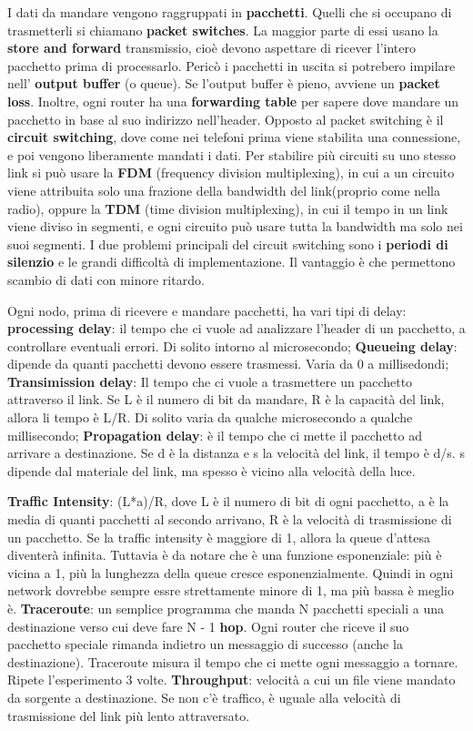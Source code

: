 \documentclass[a4paper,10pt]{article} %
\renewcommand{\b}[1]{%
    {\textbf{#1}}}
\begin{document}
\tiny

I dati da mandare vengono raggruppati in \b{pacchetti}. Quelli che si occupano di trasmetterli si chiamano \b{packet switches}. La maggior parte di essi usano la \b{store and forward} transmissio, cioè devono aspettare di ricever l'intero pacchetto prima di processarlo. Pericò i pacchetti in uscita si potrebero impilare nell'\b{output buffer} (o queue). Se l'output buffer è pieno, avviene un \b{packet loss}. Inoltre, ogni router ha una \b{forwarding table} per sapere dove mandare un pacchetto in base al suo indirizzo nell'header. 
Opposto al packet switching è il \b{circuit switching}, dove come nei telefoni prima viene stabilita una connessione, e poi vengono liberamente mandati i dati. Per stabilire più circuiti su uno stesso link si può usare la \b{FDM} (frequency division multiplexing), in cui a un circuito viene attribuita solo una frazione della bandwidth del link(proprio come nella radio), oppure la \b{TDM} (time division multiplexing), in cui il tempo in un link viene diviso in segmenti, e ogni circuito può usare tutta la bandwidth ma solo nei suoi segmenti. I due problemi principali del circuit switching sono i \b{periodi di silenzio} e le grandi difficoltà di implementazione. Il vantaggio è che permettono scambio di dati con minore ritardo.

Ogni nodo, prima di ricevere e mandare pacchetti, ha vari tipi di delay: \b{processing delay}: il tempo che ci vuole ad analizzare l'header di un pacchetto, a controllare eventuali errori. Di solito intorno al microsecondo; \b{Queueing delay}: dipende da quanti pacchetti devono essere trasmessi. Varia da 0 a millisedondi; \b{Transimission delay}: Il tempo che ci vuole a trasmettere un pacchetto attraverso il link. Se L è il numero di bit da mandare, R è la capacità del link, allora li tempo è L/R. Di solito varia da qualche microsecondo a qualche millisecondo; \b{Propagation delay}: è il tempo che ci mette il pacchetto ad arrivare a destinazione. Se d è la distanza e s la velocità del link, il tempo è d/s. s dipende dal materiale del link, ma spesso è vicino alla velocità della luce.

\b{Traffic Intensity}: (L*a)/R, dove L è il numero di bit di ogni pacchetto, a è la media di quanti pacchetti al secondo arrivano, R è la velocità di trasmissione di un pacchetto. Se la traffic intensity è maggiore di 1, allora la queue d'attesa diventerà infinita. Tuttavia è da notare che è una funzione esponenziale: più è vicina a 1, più la lunghezza della queue cresce esponenzialmente. Quindi in ogni network dovrebbe sempre essre strettamente minore di 1, ma più bassa è meglio è.
\b{Traceroute}: un semplice programma che manda N pacchetti speciali a una destinazione verso cui deve fare N - 1 \b{hop}. Ogni router che riceve il suo pacchetto speciale rimanda indietro un messaggio di successo (anche la destinazione). Traceroute misura il tempo che ci mette ogni messaggio a tornare. Ripete l'esperimento 3 volte. 
\b{Throughput}: velocità a cui un file viene mandato da sorgente a destinazione. Se non c'è traffico, è uguale alla velocità di trasmissione del link più lento attraversato. 
\end{document}
